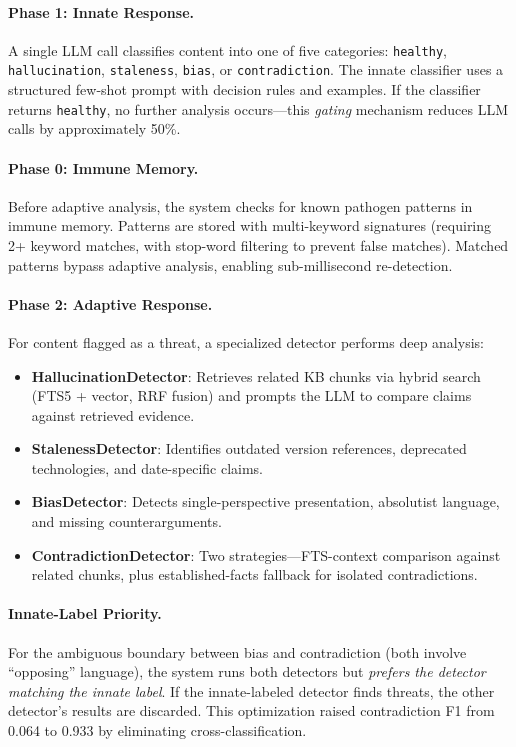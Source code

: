 \documentclass[11pt]{article}
\begin{document}
\paragraph{Phase 1: Innate Response.} A single LLM call classifies content into one of five categories: \texttt{healthy}, \texttt{hallucination}, \texttt{staleness}, \texttt{bias}, or \texttt{contradiction}. The innate classifier uses a structured few-shot prompt with decision rules and examples. If the classifier returns \texttt{healthy}, no further analysis occurs---this \emph{gating} mechanism reduces LLM calls by approximately 50\%.

\paragraph{Phase 0: Immune Memory.} Before adaptive analysis, the system checks for known pathogen patterns in immune memory. Patterns are stored with multi-keyword signatures (requiring 2+ keyword matches, with stop-word filtering to prevent false matches). Matched patterns bypass adaptive analysis, enabling sub-millisecond re-detection.

\paragraph{Phase 2: Adaptive Response.} For content flagged as a threat, a specialized detector performs deep analysis:

\begin{itemize}
    \item \textbf{HallucinationDetector}: Retrieves related KB chunks via hybrid search (FTS5 + vector, RRF fusion) and prompts the LLM to compare claims against retrieved evidence.
    \item \textbf{StalenessDetector}: Identifies outdated version references, deprecated technologies, and date-specific claims.
    \item \textbf{BiasDetector}: Detects single-perspective presentation, absolutist language, and missing counterarguments.
    \item \textbf{ContradictionDetector}: Two strategies---FTS-context comparison against related chunks, plus established-facts fallback for isolated contradictions.
\end{itemize}

\paragraph{Innate-Label Priority.} For the ambiguous boundary between bias and contradiction (both involve ``opposing'' language), the system runs both detectors but \emph{prefers the detector matching the innate label}. If the innate-labeled detector finds threats, the other detector's results are discarded. This optimization raised contradiction F1 from 0.064 to 0.933 by eliminating cross-classification.
\end{document}
